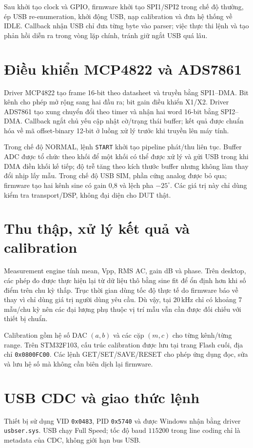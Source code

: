 \documentclass[12pt,a4paper]{report}
\newcommand{\code}[1]{\texttt{#1}}
\newcommand{\unit}[1]{\,\mathrm{#1}}
\begin{document}
Sau khởi tạo clock và GPIO, firmware khởi tạo SPI1/SPI2 trong chế độ thường, ép USB re-enumeration, khởi động USB, nạp calibration và đưa hệ thống về IDLE. Callback nhận USB chỉ đưa từng byte vào parser; việc thực thi lệnh và tạo phản hồi diễn ra trong vòng lặp chính, tránh giữ ngắt USB quá lâu.

\section{Điều khiển MCP4822 và ADS7861}
Driver MCP4822 tạo frame 16-bit theo datasheet và truyền bằng SPI1--DMA. Bit kênh cho phép mở rộng sang hai đầu ra; bit gain điều khiển X1/X2. Driver ADS7861 tạo xung chuyển đổi theo timer và nhận hai word 16-bit bằng SPI2--DMA. Callback ngắt chủ yếu cập nhật cờ/trạng thái buffer; kết quả được chuẩn hóa về mã offset-binary 12-bit ở luồng xử lý trước khi truyền lên máy tính.

Trong chế độ NORMAL, lệnh \code{START} khởi tạo pipeline phát/thu liên tục. Buffer ADC được tổ chức theo khối để một khối có thể được xử lý và gửi USB trong khi DMA điền khối kế tiếp; độ trễ tăng theo kích thước buffer nhưng không làm thay đổi nhịp lấy mẫu. Trong chế độ USB SIM, phần cứng analog được bỏ qua; firmware tạo hai kênh sine có gain 0,8 và lệch pha $-25^\circ$. Các giá trị này chỉ dùng kiểm tra transport/DSP, không đại diện cho DUT thật.

\section{Thu thập, xử lý kết quả và calibration}
Measurement engine tính mean, Vpp, RMS AC, gain dB và phase. Trên desktop, các phép đo được thực hiện lại từ dữ liệu thô bằng sine fit để ổn định hơn khi số điểm trên chu kỳ thấp. Trục thời gian dùng tốc độ thực tế do firmware báo về thay vì chỉ dùng giá trị người dùng yêu cầu. Dù vậy, tại $20\unit{kHz}$ chỉ có khoảng 7 mẫu/chu kỳ nên các đại lượng phụ thuộc vị trí mẫu vẫn cần được đối chiếu với thiết bị chuẩn.

Calibration gồm hệ số DAC $(a,b)$ và các cặp $(m,c)$ cho từng kênh/từng range. Trên STM32F103, cấu trúc calibration được lưu tại trang Flash cuối, địa chỉ \code{0x0800FC00}. Các lệnh GET/SET/SAVE/RESET cho phép ứng dụng đọc, sửa và lưu hệ số mà không cần biên dịch lại firmware.

\section{USB CDC và giao thức lệnh}
Thiết bị sử dụng VID \code{0x0483}, PID \code{0x5740} và được Windows nhận bằng driver \code{usbser.sys}. USB chạy Full Speed; tốc độ baud $115200$ trong line coding chỉ là metadata của CDC, không giới hạn bus USB.
\end{document}
